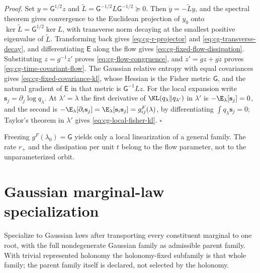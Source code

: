 \noindent\emph{Proof.}
Set \(y=\mathsf G^{1/2}z\) and \(\widetilde L=\mathsf G^{-1/2}L\mathsf G^{-1/2}\succeq0\).
Then \(\dot y=-\widetilde Ly\), and the spectral theorem gives convergence to the
Euclidean projection of \(y_0\) onto \(\ker\widetilde L=\mathsf G^{1/2}\ker L\), with
transverse norm decaying at the smallest positive eigenvalue of \(\widetilde L\).
Transforming back gives \eqref{eq:cg-r-projector} and
\eqref{eq:cg-transverse-decay}, and differentiating \(\mathsf E\) along the
flow gives \eqref{eq:cg-fixed-flow-dissipation}. Substituting \(z=g^{-1}z'\)
proves \eqref{eq:cg-flow-congruence}, and \(\dot z'=\dot gz+g\dot z\) proves
\eqref{eq:cg-time-covariant-flow}. The Gaussian relative entropy with equal
covariances gives \eqref{eq:cg-fixed-covariance-kl}, whose Hessian is the Fisher
metric \(\mathsf G\), and the natural gradient of \(\mathsf E\) in that metric
is \(\mathsf G^{-1}Lz\). For the local expansion write
\(\mathbf s_j=\partial_j\log q_\lambda\). At \(\lambda'=\lambda\) the first derivative
of \(\KL(q_\lambda\Vert q_{\lambda'})\) in \(\lambda'\) is
\(-\E_\lambda[\mathbf s_j]=0\), and the second is
\(-\E_\lambda[\partial_i\mathbf s_j]=\E_\lambda[\mathbf s_i\mathbf s_j]=g^F_{ij}(\lambda)\), by
differentiating \(\int q_\lambda\mathbf s_j=0\); Taylor's theorem in \(\lambda'\)
gives \eqref{eq:cg-local-fisher-kl}. \(\square\)

Freezing \(g^F(\lambda_0)=\mathsf G\) yields only a local linearization of a
general family. The rate \(r_+\) and the dissipation per unit \(t\) belong to
the flow parameter, not to the unparameterized orbit.

\section{Gaussian marginal-law specialization}
\label{sec:cg-gaussian-marginal-law}

Specialize  to Gaussian laws after
transporting every constituent marginal to one root, with the full nondegenerate
Gaussian family as admissible parent family. With trivial represented holonomy
the holonomy-fixed subfamily is that whole family; the parent family itself is
declared, not selected by the holonomy.

